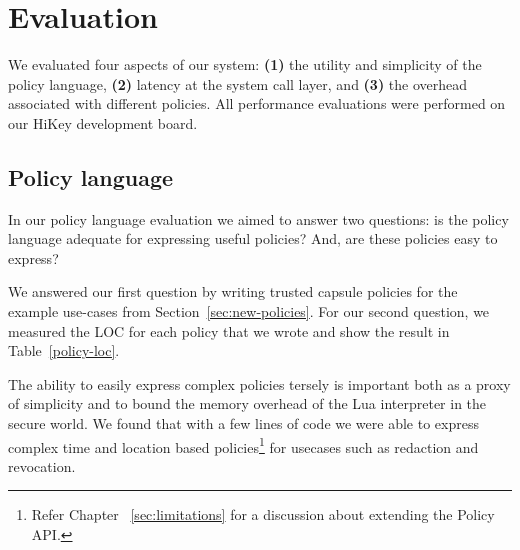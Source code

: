 \chapter{Evaluation}
\label{sec:eval}

We evaluated four aspects of our system: \textbf{(1)} the utility and
simplicity of the policy language, %
\textbf{(2)} latency at the system call layer,
and \textbf{(3)} the overhead associated with different policies. %
All performance evaluations were performed on our HiKey development board. 

 
\section{Policy language}

In our policy language evaluation we aimed to answer two questions: is
the policy language adequate for expressing useful policies? And, are
these policies easy to express?

We answered our first question by writing trusted capsule policies for
the example use-cases from Section~\ref{sec:new-policies}. For our second
question, we measured the LOC for each policy that we wrote and show
the result in Table~\ref{policy-loc}.

The ability to easily express complex policies tersely is important
both as a proxy of simplicity and to bound the memory overhead of the
Lua interpreter in the secure world. We found that with a few lines of
code we were able to express complex time and location based policies\footnote{Refer Chapter ~\ref{sec:limitations} for a discussion about extending the Policy API. } for usecases such as redaction and revocation. 





